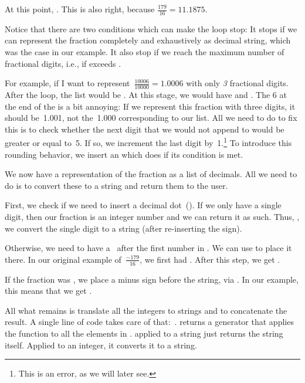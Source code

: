 At this point, .
This is also right, because $\frac{179}{16}=11.1875$.

Notice that there are two conditions which can make the loop stop:
It stops if we can represent the fraction completely and exhaustively as decimal string, which was the case in our example.
It also stop if we reach the maximum number of fractional digits, i.e., if  exceeds .

For example, if I want to represent~$\frac{10006}{10000}=1.0006$ with only \emph{3} fractional digits.
After the loop, the list  would be \pythonil{[1, 0, 0, 0]}.
At this stage, we would have  and .
The 6 at the end of the  is a bit annoying:
If we represent this fraction with three digits, it should be~1.001, not the~1.000 corresponding to our  list.
All we need to do to fix this is to check whether the next digit that we would not append to  would be greater or equal to~5.
If so, we increment the last digit by~1.\footnote{This is an error, as we will later see.}
To introduce this rounding behavior, we insert an  which does  if its condition is met.

We now have a representation of the fraction as a list of decimals.
All we need to do is to convert these to a string and return them to the user.

First, we check if we need to insert a decimal dot~().
If we only have a single digit, then our fraction is an integer number and we can return it as such.
Thus, , we convert the single digit to a string (after re-inserting the sign).

Otherwise, we need to have a~ after the first number in .
We can use  to place it there.
In our original example of~$\frac{-179}{16}$, we first had .
After this step, we get .

If the fraction was , we place a minus sign before the string, via .
In our example, this means that we get .

All what remains is translate all the integers to strings and to concatenate the result.
A single line of code takes care of that:~.
 returns a generator that applies the  function to all the elements in .
 applied to a string just returns the string itself.
Applied to an integer, it converts it to a string.

